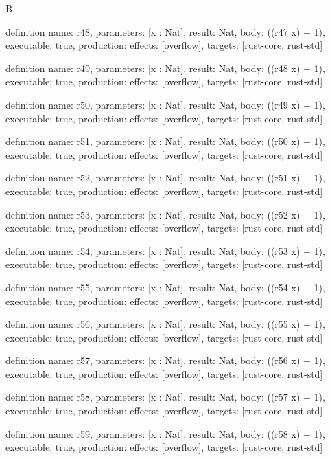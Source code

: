 \begin{lexlean}{B}
\begin{semanticmodule}
definition{
  name: r48,
  parameters: [x : Nat],
  result: Nat,
  body: ((r47 x) + 1),
  executable: true,
  production: {effects: [overflow], targets: [rust-core, rust-std]}
}

definition{
  name: r49,
  parameters: [x : Nat],
  result: Nat,
  body: ((r48 x) + 1),
  executable: true,
  production: {effects: [overflow], targets: [rust-core, rust-std]}
}

definition{
  name: r50,
  parameters: [x : Nat],
  result: Nat,
  body: ((r49 x) + 1),
  executable: true,
  production: {effects: [overflow], targets: [rust-core, rust-std]}
}

definition{
  name: r51,
  parameters: [x : Nat],
  result: Nat,
  body: ((r50 x) + 1),
  executable: true,
  production: {effects: [overflow], targets: [rust-core, rust-std]}
}

definition{
  name: r52,
  parameters: [x : Nat],
  result: Nat,
  body: ((r51 x) + 1),
  executable: true,
  production: {effects: [overflow], targets: [rust-core, rust-std]}
}

definition{
  name: r53,
  parameters: [x : Nat],
  result: Nat,
  body: ((r52 x) + 1),
  executable: true,
  production: {effects: [overflow], targets: [rust-core, rust-std]}
}

definition{
  name: r54,
  parameters: [x : Nat],
  result: Nat,
  body: ((r53 x) + 1),
  executable: true,
  production: {effects: [overflow], targets: [rust-core, rust-std]}
}

definition{
  name: r55,
  parameters: [x : Nat],
  result: Nat,
  body: ((r54 x) + 1),
  executable: true,
  production: {effects: [overflow], targets: [rust-core, rust-std]}
}

definition{
  name: r56,
  parameters: [x : Nat],
  result: Nat,
  body: ((r55 x) + 1),
  executable: true,
  production: {effects: [overflow], targets: [rust-core, rust-std]}
}

definition{
  name: r57,
  parameters: [x : Nat],
  result: Nat,
  body: ((r56 x) + 1),
  executable: true,
  production: {effects: [overflow], targets: [rust-core, rust-std]}
}

definition{
  name: r58,
  parameters: [x : Nat],
  result: Nat,
  body: ((r57 x) + 1),
  executable: true,
  production: {effects: [overflow], targets: [rust-core, rust-std]}
}

definition{
  name: r59,
  parameters: [x : Nat],
  result: Nat,
  body: ((r58 x) + 1),
  executable: true,
  production: {effects: [overflow], targets: [rust-core, rust-std]}
}
\end{semanticmodule}
\end{lexlean}
